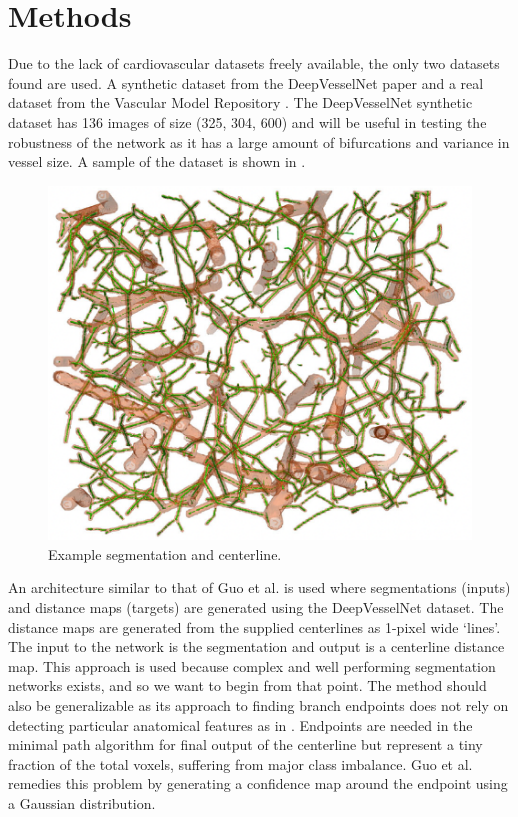 \documentclass[10pt,twocolumn,letterpaper]{article}
\begin{document}
\section{Methods}

Due to the lack of cardiovascular datasets freely available, the only two datasets found are used. A synthetic dataset from the DeepVesselNet paper and a real dataset from the Vascular Model Repository \cite{wilsonVascularModelRepository2013}. The DeepVesselNet synthetic dataset has 136 images of size (325, 304, 600) and will be useful in testing the robustness of the network as it has a large amount of bifurcations and variance in vessel size. A sample of the dataset is shown in .

\begin{figure}[!h]
    \begin{center}
       \includegraphics[width=0.95\linewidth]{figures/dataset-deepvesselnet.png}
    \end{center}
       \caption{Example segmentation and centerline.}
    \label{fig:dataset example}
\end{figure}

An architecture similar to that of Guo et al. \cite{guoDeepCenterlineMultitaskFully2019} is used where segmentations (inputs) and distance maps (targets) are generated using the DeepVesselNet dataset. The distance maps are generated from the supplied centerlines as 1-pixel wide `lines'. The input to the network is the segmentation and output is a centerline distance map. This approach is used because complex and well performing segmentation networks exists, and so we want to begin from that point. The method should also be generalizable as its approach to finding branch endpoints does not rely on detecting particular anatomical features as in \cite{mostafaImprovedCenterlineExtraction2021}. Endpoints are needed in the minimal path algorithm for final output of the centerline but represent a tiny fraction of the total voxels, suffering from major class imbalance. Guo et al. remedies this problem by generating a confidence map around the endpoint using a Gaussian distribution.
\end{document}
